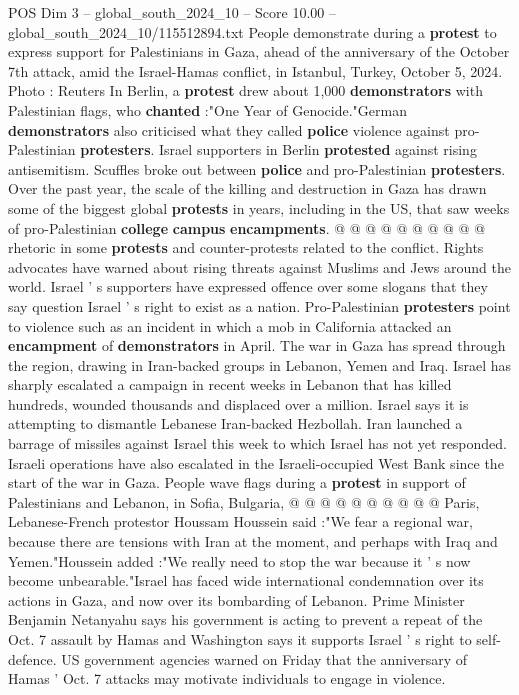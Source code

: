 \begin{textsample}{POS Dim 3 – global\_south\_2024\_10 – Score 10.00 – global\_south\_2024\_10/115512894.txt}
People demonstrate during a \textbf{protest} to express support for Palestinians in Gaza, ahead of the anniversary of the October 7th attack, amid the Israel-Hamas conflict, in Istanbul, Turkey, October 5, 2024.
Photo : Reuters In Berlin, a \textbf{protest} drew about 1,000 \textbf{demonstrators} with Palestinian flags, who \textbf{chanted} :"One Year of Genocide."German \textbf{demonstrators} also criticised what they called \textbf{police} violence against pro-Palestinian \textbf{protesters}.
Israel supporters in Berlin \textbf{protested} against rising antisemitism.
Scuffles broke out between \textbf{police} and pro-Palestinian \textbf{protesters}.
Over the past year, the scale of the killing and destruction in Gaza has drawn some of the biggest global \textbf{protests} in years, including in the US, that saw weeks of pro-Palestinian \textbf{college} \textbf{campus} \textbf{encampments}. @ @ @ @ @ @ @ @ @ @ rhetoric in some \textbf{protests} and counter-protests related to the conflict.
Rights advocates have warned about rising threats against Muslims and Jews around the world.
Israel ' s supporters have expressed offence over some slogans that they say question Israel ' s right to exist as a nation.
Pro-Palestinian \textbf{protesters} point to violence such as an incident in which a mob in California attacked an \textbf{encampment} of \textbf{demonstrators} in April.
The war in Gaza has spread through the region, drawing in Iran-backed groups in Lebanon, Yemen and Iraq.
Israel has sharply escalated a campaign in recent weeks in Lebanon that has killed hundreds, wounded thousands and displaced over a million.
Israel says it is attempting to dismantle Lebanese Iran-backed Hezbollah.
Iran launched a barrage of missiles against Israel this week to which Israel has not yet responded.
Israeli operations have also escalated in the Israeli-occupied West Bank since the start of the war in Gaza.
People wave flags during a \textbf{protest} in support of Palestinians and Lebanon, in Sofia, Bulgaria, @ @ @ @ @ @ @ @ @ @ Paris, Lebanese-French protestor Houssam Houssein said :"We fear a regional war, because there are tensions with Iran at the moment, and perhaps with Iraq and Yemen."Houssein added :"We really need to stop the war because it ' s now become unbearable."Israel has faced wide international condemnation over its actions in Gaza, and now over its bombarding of Lebanon.
Prime Minister Benjamin Netanyahu says his government is acting to prevent a repeat of the Oct. 7 assault by Hamas and Washington says it supports Israel ' s right to self-defence.
US government agencies warned on Friday that the anniversary of Hamas ' Oct. 7 attacks may motivate individuals to engage in violence.

\end{textsample}

